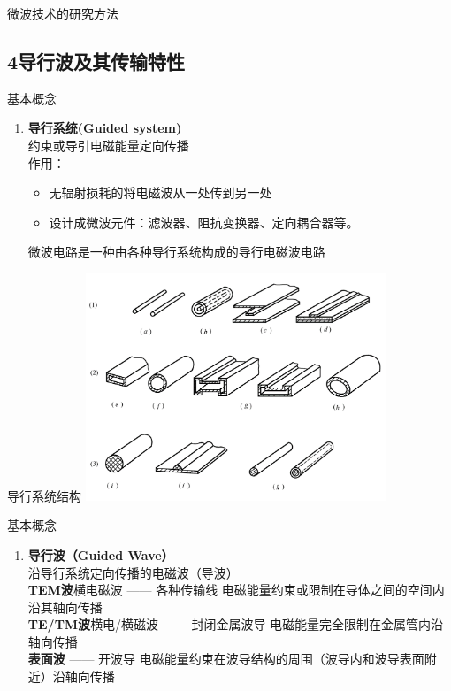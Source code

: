 \documentclass{ctexbeamer}
\newcounter{savedenum}
\newcommand*{\saveenum}{\setcounter{savedenum}{\theenumi}}
\newcommand*{\resume}{\setcounter{enumi}{\thesavedenum}}
\begin{document}
\begin{frame}{微波技术的研究方法}

\end{frame}

\subsection{4\quad 导行波及其传输特性}
\begin{frame}{基本概念}
  \begin{enumerate}
    \item \textbf{导行系统(Guided system)}
    \saveenum
    \\约束或导引电磁能量定向传播\\
    作用：\\
    \begin{itemize}
      \item 无辐射损耗的将电磁波从一处传到另一处
      \item 设计成微波元件：滤波器、阻抗变换器、定向耦合器等。
    \end{itemize}
    微波电路是一种由各种导行系统构成的导行电磁波电路
  \end{enumerate}

\end{frame}

\begin{frame}{导行系统结构}
    \centering
    \includegraphics[width=9cm]{guidesystem.png}
\end{frame}

\begin{frame}{基本概念}
  \begin{enumerate}
    \resume
    \item \textbf{导行波（Guided Wave）}
    \\沿导行系统定向传播的电磁波（导波）
    \\\textbf{TEM波}\quad 横电磁波 —— 各种传输线 电磁能量约束或限制在导体之间的空间内沿其轴向传播
    \\\textbf{TE/TM波}\quad 横电/横磁波 —— 封闭金属波导 电磁能量完全限制在金属管内沿轴向传播
    \\\textbf{表面波} —— 开波导 电磁能量约束在波导结构的周围（波导内和波导表面附近）沿轴向传播
    \saveenum
  \end{enumerate}
\end{frame}
\end{document}
